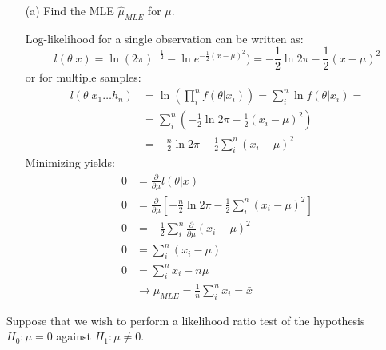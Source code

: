 \documentclass{article}
\newcommand{\1}{\mathbf{1}}
\begin{document}
 \begin{itemize}
    \item[(a)] Find the MLE $\hat{\mu}_{MLE}$ for $\mu$.
    
    Log-likelihood for a single observation can be written as:
    $$l(\theta|x) = \ln{(2\pi)^{-\frac{1}{2}}} - \ln{e^{-\frac{1}{2}(x-\mu)^2})} = -\frac{1}{2}\ln{2\pi} - \frac{1}{2}(x-\mu)^2 $$
    or for multiple samples:
    \begin{align*}
        l(\theta|x_1\hdots h_n) &= \ln{\left(\prod_i^n f(\theta | x_i)\right)} = \sum_i^n \ln{f(\theta|x_i)} = \\
        &= \sum_i^n\left( -\frac{1}{2}\ln{2\pi} - \frac{1}{2}(x_i -\mu)^2 \right) \\
        &=  -\frac{n}{2}\ln{2\pi} - \frac{1}{2} \sum_i^n (x_i -\mu)^2
    \end{align*}
    Minimizing yields:
    \begin{align*}
        0 &= \frac{\partial}{\partial\mu} l(\theta|x) \\
        0 &= \frac{\partial}{\partial\mu} \left[  -\frac{n}{2}\ln{2\pi} - \frac{1}{2} \sum_i^n (x_i -\mu)^2 \right] \\
        0 &= - \frac{1}{2}  \sum_i^n \frac{\partial}{\partial\mu}  (x_i -\mu)^2 \\
        0 &= \sum_i^n (x_i -\mu) \\
        0 &= \sum_i^n x_i - n\mu \\
        &\rightarrow \mu_{MLE} = \frac{1}{n} \sum_i^n x_i = \bar x
    \end{align*}
\end{itemize}
\newpage
\noindent Suppose that we wish to perform a likelihood ratio test of the hypothesis $H_0:\mu = 0$ against  $H_1: \mu \neq 0$.
\end{document}
